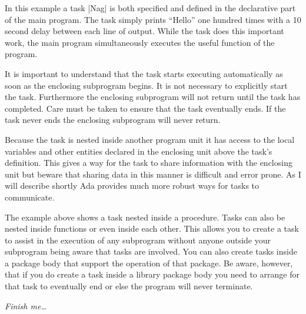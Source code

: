 In this example a task |Nag| is both specified and defined in the declarative part of the main
program. The task simply prints ``Hello'' one hundred times with a 10 second delay between each
line of output. While the task does this important work, the main program simultaneously
executes the useful function of the program.

It is important to understand that the task starts executing automatically as soon as the
enclosing subprogram begins. It is not necessary to explicitly start the task. Furthermore the
enclosing subprogram will not return until the task has completed. Care must be taken to ensure
that the task eventually ends. If the task never ends the enclosing subprogram will never
return.

Because the task is nested inside another program unit it has access to the local variables and
other entities declared in the enclosing unit above the task's definition. This gives a way for
the task to share information with the enclosing unit but beware that sharing data in this
manner is difficult and error prone. As I will describe shortly Ada provides much more robust
ways for tasks to communicate.

The example above shows a task nested inside a procedure. Tasks can also be nested inside
functions or even inside each other. This allows you to create a task to assist in the execution
of any subprogram without anyone outside your subprogram being aware that tasks are involved.
You can also create tasks inside a package body that support the operation of that package. Be
aware, however, that if you do create a task inside a library package body you need to arrange
for that task to eventually end or else the program will never terminate.

\textit{Finish me\ldots}

